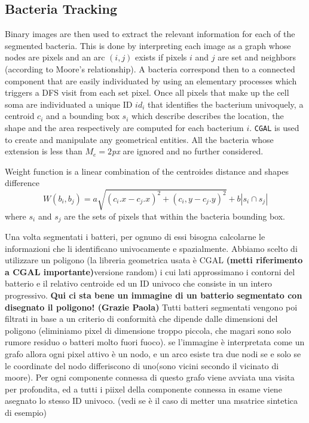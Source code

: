 \documentclass[conference]{IEEEtran}
\begin{document}
\subsection{Bacteria Tracking}
Binary images are then used to extract the relevant information for each of the segmented bacteria. This is done by interpreting each image as a graph whose nodes are pixels and an arc $(i,j)$ exists if pixels $i$ and $j$ are set and neighbors (according to Moore's relationship). A bacteria correspond then to a connected component that are easily individuated by using an elementary processes which triggers a DFS visit from each set pixel. Once all pixels that make up the cell soma are individuated a unique ID $id_i$ that  identifies the bacterium univoquely, a centroid $c_i$ and a bounding box $s_i$ which describe describes the location, the shape and the area respectively are computed for each bacterium $i$. \texttt{CGAL} \cite{CGAL} is used to create and manipulate any geometrical entities. All the bacteria whose extension is less than $M_e = 2$\textit{px} are ignored and no further considered.

Weight function is a linear combination of the centroides distance and shapes difference 
\[
W(b_i,b_j) = a \sqrt{(c_i.x - c_j.x)^2 + (c_i,y-c_j.y)^2} + b |s_i \cap s_j|
\]
where $s_i$ and $s_j$ are the sets of pixels that within the bacteria bounding box.

 Una volta segmentati  i batteri, per ognuno di essi bisogna calcolarne le informazioni che li identificano univocamente e spazialmente. Abbiamo scelto di utilizzare un poligono (la libreria geometrica usata è CGAL \textbf{(metti riferimento a CGAL importante)}versione random) i cui lati approssimano i contorni del batterio e il relativo centroide ed un ID  univoco che consiste in un intero progressivo. \textbf{Qui ci sta bene un immagine di un batterio segmentato con disegnato il poligono! (Grazie Paola)}
 Tutti batteri segmentati vengono poi filtrati in base a un criterio di conformità che dipende dalle dimensioni del poligono (eliminiamo pixel di dimensione troppo piccola, che magari sono solo rumore residuo o batteri molto fuori fuoco). se l'immagine è interpretata come un grafo allora ogni pixel attivo è un nodo, e  un arco esiste tra due nodi se e solo se le coordinate del nodo differiscono di uno(sono vicini secondo il vicinato di moore). Per ogni componente connessa di questo grafo viene avviata una visita per profondita, ed a tutti i piixel della componente connessa in esame viene asegnato lo stesso ID univoco. (vedi se è il caso di metter una msatrice sintetica di esempio)
\end{document}
